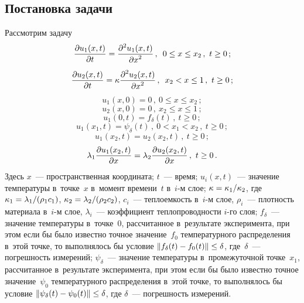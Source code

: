\begin{multicols}{2}
\section{Постановка задачи}

  Рассмотрим задачу
  \begin{equation}
  \displaystyle\frac{\displaystyle \partial u_1(x,t)\mathstrut}{\displaystyle \partial t\mathstrut} =\displaystyle\frac{\displaystyle \partial^2 u_1(x,t)\mathstrut}{\displaystyle \partial x^2\mathstrut}\,,\enskip 
0\leq x\leq x_2\,,\ t\geq0\,;\label{e1-sr}
  \end{equation}
  \begin{equation}
  \displaystyle\frac{\displaystyle \partial u_2(x,t)\mathstrut}{\displaystyle \partial t\mathstrut} =\kappa\displaystyle\frac{\displaystyle \partial^2 u_2(x,t)\mathstrut}{\displaystyle \partial 
x^2\mathstrut}\,,\enskip x_2<x\leq 1\,,\ t\geq 0\,;\label{e2-sr}
  \end{equation}
  \begin{equation}
  u_1(x,0)=0\,,\ 0\leq x\leq x_2\,;\label{e3-sr}
  \end{equation}
  \begin{equation}
  u_2(x,0)=0\,,\ x_2\leq x\leq1\,;\label{e4-sr}
  \end{equation}
      \begin{equation}
  u_1(0,t)=f_\delta(t)\,,\ t\geq 0\,;
  \label{e5-sr}
  \end{equation}
  \begin{equation}
  u_1(x_1,t)=\psi_\delta(t)\,,\ 0<x_1<x_2\,,\ t\geq0\,;
  \label{e6-sr}
  \end{equation}
  \begin{equation}
  u_1(x_2,t)=u_2(x_2,t)\,,\ t\geq 0\,;
  \label{e7-sr}
  \end{equation}
  \begin{equation}
  \lambda_1\displaystyle\frac{\displaystyle \partial u_1(x_2,t)\mathstrut}{\displaystyle \partial x\mathstrut} =\lambda_2 \displaystyle\frac{\displaystyle \partial 
u_2(x_2,t)\mathstrut}{\displaystyle \partial x\mathstrut}\,,\ t\geq0\,.
  \label{e8-sr}
  \end{equation}
Здесь $x$~--- пространственная координата; $t$~--- время; $u_i(x,t)$~--- значение 
температуры в~точке~$x$ в~момент времени~$t$ в~$i$-м слое; 
$\kappa\hm=\kappa_1/\kappa_2$, где $\kappa_1\hm= \lambda_1/(\rho_1c_1)$, 
$\kappa_2\hm= \lambda_2/(\rho_2 c_2)$, $c_i$~--- теплоемкость в~$i$-м слое, 
$\rho_i$~--- плотность материала в~$i$-м слое, $\lambda_i$~--- коэффициент 
теплопроводности $i$-го слоя; $f_\delta$~--- значение температуры в~точке~0, 
рассчитанное в~результате эксперимента, при этом если бы было известно 
точное значение~$f_0$ температурного распределения в~этой точке, то 
выполнялось бы условие $\| f_\delta (t) \hm- f_0(t)\| \hm\leq \delta$, 
где~$\delta$~--- 
погрешность измерений; $\psi_\delta$~--- значение температуры 
в~промежуточной точке~$x_1$, рассчитанное в~результате эксперимента, при 
этом если бы было известно точное значение~$\psi_0$ температурного 
распределения в~этой точке, то выполнялось бы условие $\| \psi_\delta(t)\hm- 
\psi_0(t)\| \hm\leq \delta$, где $\delta$~--- погрешность измерений.
  

\end{multicols}
